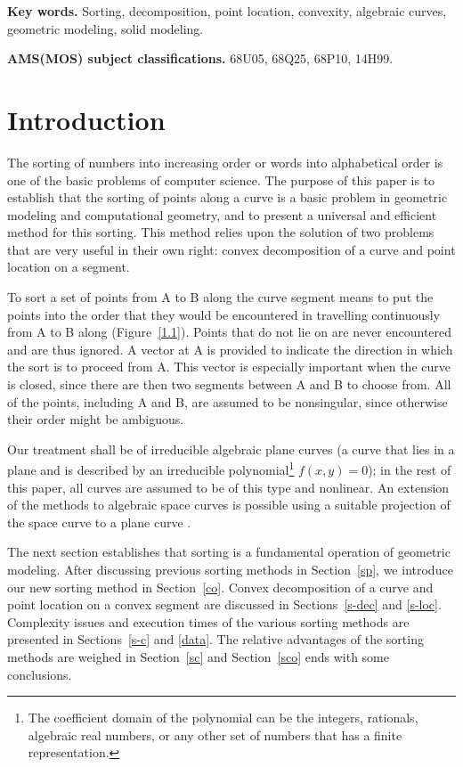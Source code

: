 {\bf Key words.} Sorting, decomposition, point location, convexity, algebraic curves,
geometric modeling, solid modeling.

{\bf AMS(MOS) subject classifications.} 68U05, 68Q25, 68P10, 14H99.

\section{Introduction}
%
The sorting of numbers into increasing order or words 
into alphabetical order is one of the basic problems of computer science.  
The purpose of this paper is to establish that the sorting of points
along a curve is a basic problem in geometric modeling and computational geometry,
and to present a universal and efficient method for this sorting.
This method relies upon the solution of two problems that are very useful in their
own right: convex decomposition of a curve and point location on a segment.

To sort a set of points from A to B along the curve segment  means to
put the points into the order that they would be encountered in travelling
continuously from A to B along  (Figure~\ref{1.1}).
Points that do not lie on  are never encountered and are thus ignored.
A vector at A is provided to indicate the direction in which the sort is to
proceed from A. 
This vector is especially important when the curve is closed, since
there are then two segments between A and B to choose from.
All of the points, including A and B, are assumed to be nonsingular,
since otherwise their order might be ambiguous.
%

Our treatment shall be of irreducible algebraic plane curves (a curve that 
lies in a plane and is described by an irreducible polynomial\footnote{The coefficient
	domain of the polynomial can be the integers, rationals, algebraic real numbers,
	or any other set of numbers that has a finite representation.}
$f(x,y)=0$); 
in the rest of this paper, all curves are assumed to be of this type and nonlinear.
An extension of the methods to algebraic space curves is possible using 
a suitable projection of the space curve to a plane curve \cite{jj}.

The next section establishes that sorting is a fundamental operation of 
geometric modeling.
After discussing previous sorting methods in
Section~\ref{sp},
we introduce our new sorting method in
Section~\ref{co}.
Convex decomposition of a curve
and point location on a convex segment 
are discussed in Sections~\ref{s-dec} 
and \ref{s-loc}.
Complexity issues and execution times of the
various sorting methods are presented in
Sections~\ref{s-c} and \ref{data}.
The relative advantages of the sorting methods
are weighed in Section~\ref{sc} 
and Section~\ref{sco} ends with 
some conclusions.


